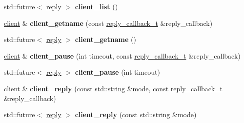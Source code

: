 \begin{DoxyCompactItemize}
\mbox{\label{classcpp__redis_1_1client_a0480140cc584e6dd2a0a6fab9da10cc5}} 
std\+::future$<$ \hyperlink{classcpp__redis_1_1reply}{reply} $>$ {\bfseries client\+\_\+list} ()
\item 
\mbox{\label{classcpp__redis_1_1client_ac4e058eaa75eb04c7a8017a779d5015e}} 
\hyperlink{classcpp__redis_1_1client}{client} \& {\bfseries client\+\_\+getname} (const \hyperlink{classcpp__redis_1_1client_a061a1140d36d2eaeda82b09a0bb3f9f2}{reply\+\_\+callback\+\_\+t} \&reply\+\_\+callback)
\item 
\mbox{\label{classcpp__redis_1_1client_a89068e68b418906e9e34cb9a95f7a179}} 
std\+::future$<$ \hyperlink{classcpp__redis_1_1reply}{reply} $>$ {\bfseries client\+\_\+getname} ()
\item 
\mbox{\label{classcpp__redis_1_1client_acdf001d60d1d82d3f090b7c679e3183e}} 
\hyperlink{classcpp__redis_1_1client}{client} \& {\bfseries client\+\_\+pause} (int timeout, const \hyperlink{classcpp__redis_1_1client_a061a1140d36d2eaeda82b09a0bb3f9f2}{reply\+\_\+callback\+\_\+t} \&reply\+\_\+callback)
\item 
\mbox{\label{classcpp__redis_1_1client_a2c73a6f9b2e3f1a0afbaca9fddd29199}} 
std\+::future$<$ \hyperlink{classcpp__redis_1_1reply}{reply} $>$ {\bfseries client\+\_\+pause} (int timeout)
\item 
\mbox{\label{classcpp__redis_1_1client_a5e49e9bf9bb72659b33013fac751a712}} 
\hyperlink{classcpp__redis_1_1client}{client} \& {\bfseries client\+\_\+reply} (const std\+::string \&mode, const \hyperlink{classcpp__redis_1_1client_a061a1140d36d2eaeda82b09a0bb3f9f2}{reply\+\_\+callback\+\_\+t} \&reply\+\_\+callback)
\item 
\mbox{\label{classcpp__redis_1_1client_a1b378de0c1805069b9bbecd4fca4091c}} 
std\+::future$<$ \hyperlink{classcpp__redis_1_1reply}{reply} $>$ {\bfseries client\+\_\+reply} (const std\+::string \&mode)
\item 
\mbox{\label{classcpp__redis_1_1client_a5c7f977196c1c00e3c732615c0d86ae7}} 

\end{DoxyCompactItemize}
